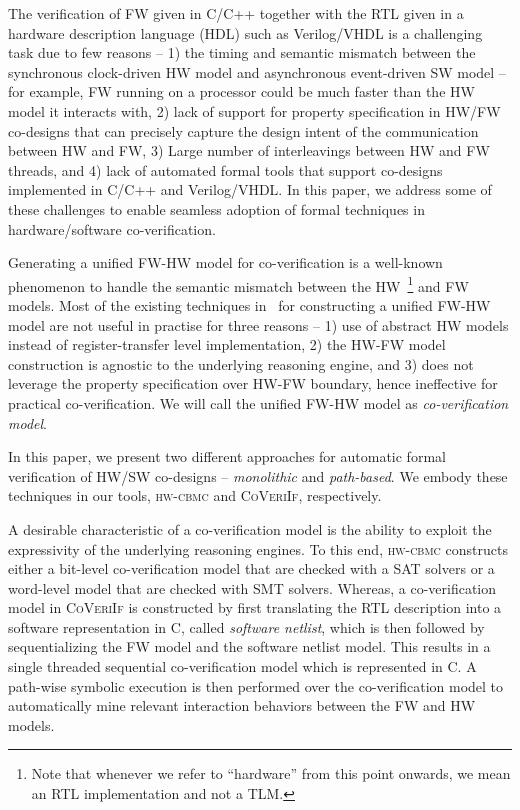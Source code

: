 \documentclass[sigconf]{acmart}
\newcommand{\tool}[1]{\textsc{#1}\xspace}
\newcommand{\hwcbmcv}{\tool{hw-cbmc}}
\newcommand{\verifox}{\tool{CoVeriIf}}
\begin{document}
The verification of FW given in C/C++ together with the RTL given in a hardware
description language (HDL) such as Verilog/VHDL is a challenging task due to 
few reasons -- 1) the timing and semantic mismatch between the synchronous
clock-driven HW model and asynchronous event-driven SW model -- for example,
FW running on a processor could be much faster than the HW
model it interacts with, 2) lack of support for property specification in 
HW/FW co-designs that can precisely capture the design intent of the 
communication between HW and FW, 3) Large
number of interleavings between HW and FW threads, and 4) lack 
of automated formal tools that support co-designs implemented in C/C++ and 
Verilog/VHDL.   In this paper, we address some of these challenges to enable
seamless adoption of formal techniques in hardware/software co-verification.   


Generating a unified FW-HW model for co-verification is a 
well-known phenomenon to handle the semantic mismatch between the 
HW~\footnote{Note that whenever we refer to ``hardware'' 
from this point onwards, we mean an RTL implementation 
and not a TLM.}  and FW models.  Most of the existing techniques 
in~\cite{fmsd02,emsoft07,fase10} for constructing a unified FW-HW model are not 
useful in practise for three reasons -- 1) use of abstract HW models 
instead of register-transfer level implementation, 2) the HW-FW model
construction is agnostic to the underlying reasoning engine, and 3) 
does not leverage the property specification over HW-FW boundary, hence 
ineffective for practical co-verification.  We will call the unified FW-HW 
model as \emph{co-verification model}. 

In this paper, we present two different approaches for automatic formal
verification of HW/SW co-designs -- \emph{monolithic} and \emph{path-based}.  
We embody these techniques in our tools, \hwcbmcv and \verifox, respectively. 


A desirable characteristic of a co-verification model is the ability to exploit 
the expressivity of the underlying reasoning engines.  To this end, \hwcbmcv
constructs either a bit-level co-verification model that are checked with a SAT solvers 
or a word-level model that are checked with SMT solvers.  Whereas, a 
co-verification model in \verifox is constructed 
by first translating the RTL description into a software representation in C,
called \emph{software netlist}, which is then followed by sequentializing the FW 
model and the software netlist model.  This results in a single
threaded sequential co-verification model which is represented in C. A path-wise 
symbolic execution is then performed over the co-verification model to
automatically mine relevant interaction behaviors between the FW and HW models.   
\end{document}
